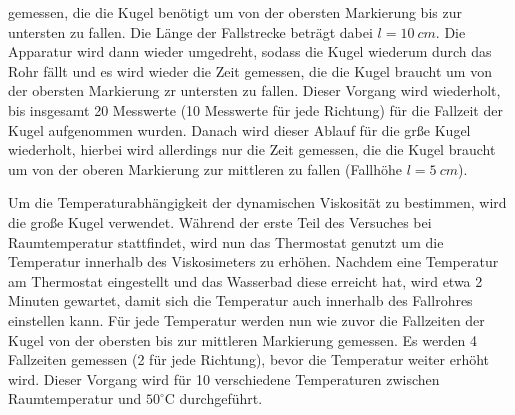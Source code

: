 gemessen, die die Kugel benötigt um von der obersten Markierung bis zur untersten zu fallen. Die Länge der Fallstrecke beträgt dabei $l = \SI{10}{cm}$. Die Apparatur wird dann wieder 
umgedreht, sodass die Kugel wiederum durch das Rohr fällt und es wird wieder die Zeit gemessen, die die Kugel braucht um von der obersten Markierung zr untersten zu fallen. Dieser 
Vorgang wird wiederholt, bis insgesamt 20 Messwerte (10 Messwerte für jede Richtung) für die Fallzeit der Kugel aufgenommen wurden. Danach wird dieser Ablauf für die grße Kugel 
wiederholt, hierbei wird allerdings nur die Zeit gemessen, die die Kugel braucht um von der oberen Markierung zur mittleren zu fallen (Fallhöhe $l = \SI{5}{cm}$).

\noindent Um die Temperaturabhängigkeit der dynamischen Viskosität zu bestimmen, wird die große Kugel verwendet. Während der erste Teil des Versuches bei Raumtemperatur stattfindet, 
wird nun das Thermostat genutzt um die Temperatur innerhalb des Viskosimeters zu erhöhen. Nachdem eine Temperatur am Thermostat eingestellt und das Wasserbad diese erreicht hat, 
wird etwa 2 Minuten gewartet, damit sich die Temperatur auch innerhalb des Fallrohres einstellen kann. Für jede Temperatur werden nun wie zuvor die Fallzeiten der Kugel von der 
obersten bis zur mittleren Markierung gemessen. Es werden 4 Fallzeiten gemessen (2 für jede Richtung), bevor die Temperatur weiter erhöht wird. Dieser Vorgang wird für 10 
verschiedene Temperaturen zwischen Raumtemperatur und $50^\circ \text{C}$ durchgeführt.